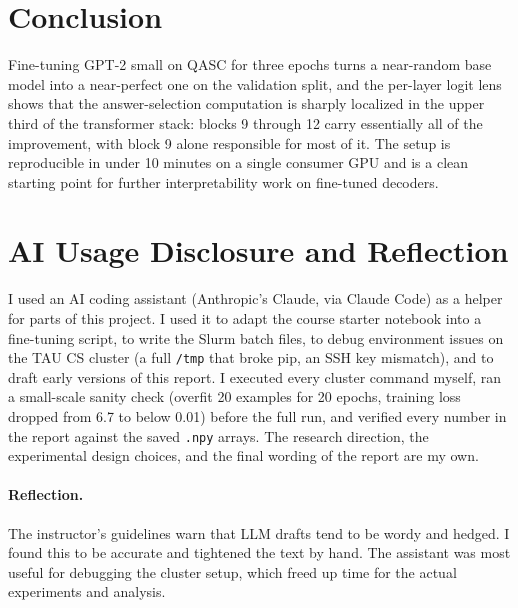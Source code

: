 \documentclass[11pt]{article}
\begin{document}
\section{Conclusion}

Fine-tuning GPT-2 small on QASC for three epochs turns a near-random base
model into a near-perfect one on the validation split, and the per-layer logit
lens shows that the answer-selection computation is sharply localized in the
upper third of the transformer stack: blocks 9 through 12 carry essentially
all of the improvement, with block 9 alone responsible for most of it. The
setup is reproducible in under 10 minutes on a single consumer GPU and is a
clean starting point for further interpretability work on fine-tuned decoders.




\appendix

\section*{AI Usage Disclosure and Reflection}

I used an AI coding assistant (Anthropic's Claude, via Claude Code) as a
helper for parts of this project. I used it to adapt the course starter
notebook into a fine-tuning script, to write the Slurm batch files, to
debug environment issues on the TAU CS cluster (a full \texttt{/tmp} that
broke pip, an SSH key mismatch), and to draft early versions of this
report. I executed every cluster command myself, ran a small-scale sanity
check (overfit 20 examples for 20 epochs, training loss dropped from 6.7
to below 0.01) before the full run, and verified every number in the
report against the saved \texttt{.npy} arrays. The research direction,
the experimental design choices, and the final wording of the report are
my own.

\paragraph{Reflection.} The instructor's guidelines warn that LLM drafts
tend to be wordy and hedged. I found this to be accurate and tightened the
text by hand. The assistant was most useful for debugging the cluster
setup, which freed up time for the actual experiments and analysis.
\end{document}
